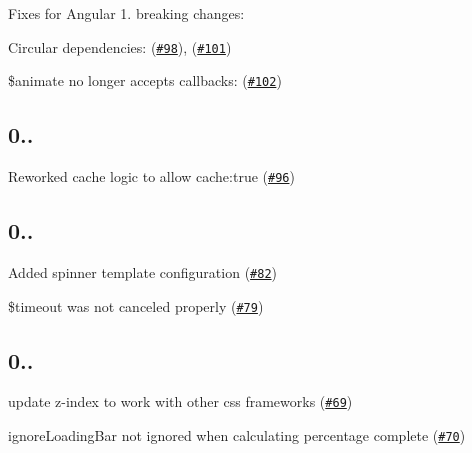 Fixes for Angular 1. breaking changes\+:
\begin{DoxyItemize}
\item Circular dependencies\+: (\href{https://github.com/chieffancypants/angular-loading-bar/issues/98}{\tt \#98}), (\href{https://github.com/chieffancypants/angular-loading-bar/pull/101}{\tt \#101})
\item \$animate no longer accepts callbacks\+: (\href{https://github.com/chieffancypants/angular-loading-bar/pull/102}{\tt \#102})
\end{DoxyItemize}

\subsection*{0..}


\begin{DoxyItemize}
\item Reworked cache logic to allow cache\+:true (\href{https://github.com/chieffancypants/angular-loading-bar/pull/96}{\tt \#96})
\end{DoxyItemize}

\subsection*{0..}


\begin{DoxyItemize}
\item Added spinner template configuration (\href{https://github.com/chieffancypants/angular-loading-bar/pull/82}{\tt \#82})
\item \$timeout was not canceled properly (\href{https://github.com/chieffancypants/angular-loading-bar/pull/79}{\tt \#79})
\end{DoxyItemize}

\subsection*{0..}


\begin{DoxyItemize}
\item update z-\/index to work with other css frameworks (\href{https://github.com/chieffancypants/angular-loading-bar/pull/69}{\tt \#69})
\item ignore\+Loading\+Bar not ignored when calculating percentage complete (\href{https://github.com/chieffancypants/angular-loading-bar/pull/70}{\tt \#70})
\end{DoxyItemize}

